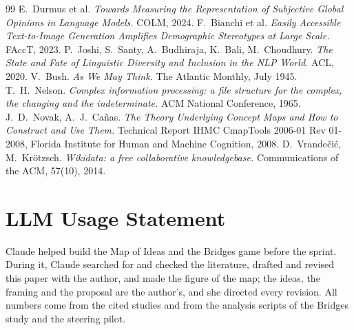 \documentclass[11pt]{article}
\begin{document}
\begin{thebibliography}{99}
 E.\ Durmus et al. \emph{Towards Measuring the Representation of Subjective Global Opinions in Language Models.} COLM, 2024.
 F.\ Bianchi et al. \emph{Easily Accessible Text-to-Image Generation Amplifies Demographic Stereotypes at Large Scale.} FAccT, 2023.
 P.\ Joshi, S.\ Santy, A.\ Budhiraja, K.\ Bali, M.\ Choudhury. \emph{The State and Fate of Linguistic Diversity and Inclusion in the NLP World.} ACL, 2020.
 V.\ Bush. \emph{As We May Think.} The Atlantic Monthly, July 1945.
 T.\ H.\ Nelson. \emph{Complex information processing: a file structure for the complex, the changing and the indeterminate.} ACM National Conference, 1965.
 J.\ D.\ Novak, A.\ J.\ Cañas. \emph{The Theory Underlying Concept Maps and How to Construct and Use Them.} Technical Report IHMC CmapTools 2006-01 Rev 01-2008, Florida Institute for Human and Machine Cognition, 2008.
 D.\ Vrandečić, M.\ Krötzsch. \emph{Wikidata: a free collaborative knowledgebase.} Communications of the ACM, 57(10), 2014.
\end{thebibliography}

\section*{LLM Usage Statement}
Claude helped build the Map of Ideas and the Bridges game before the sprint. During it, Claude searched for and checked the literature, drafted and revised this paper with the author, and made the figure of the map; the ideas, the framing and the proposal are the author's, and she directed every revision. All numbers come from the cited studies and from the analysis scripts of the Bridges study and the steering pilot.
\end{document}
